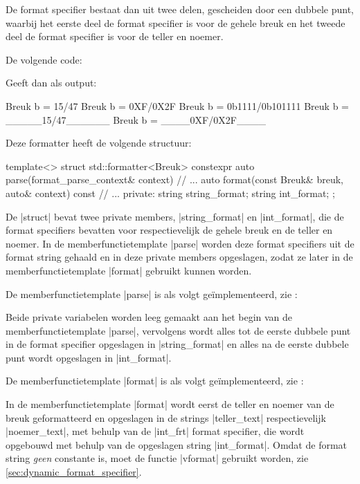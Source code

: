 \begin{cpplstShortInline}
De format specifier bestaat dan uit twee delen, gescheiden door een dubbele punt, waarbij het eerste deel de format specifier is voor de gehele breuk en het tweede deel de format specifier is voor de teller en noemer.

De volgende code:

Geeft dan als output:
\begin{coutput}
Breuk b = 15/47
Breuk b = 0XF/0X2F
Breuk b = 0b1111/0b101111
Breuk b = _____15/47______
Breuk b = ____0XF/0X2F____
\end{coutput}

Deze formatter heeft de volgende structuur:
\begin{cpplstfragment}
template<>
struct std::formatter<Breuk> {
    constexpr auto parse(format_parse_context& context) {
	// ...
	}
	auto format(const Breuk& breuk, auto& context) const {
	// ...
	}
private:
    string string_format;
    string int_format;
};
\end{cpplstfragment}

De |struct| bevat twee private members, |string_format| en |int_format|, die de format specifiers bevatten voor respectievelijk de gehele breuk en de teller en noemer.
In de memberfunctietemplate |parse| worden deze format specifiers uit de format string gehaald en in deze private members opgeslagen, zodat ze later in de memberfunctietemplate |format| gebruikt kunnen worden.

De memberfunctietemplate |parse| is als volgt geïmplementeerd, zie :

Beide private variabelen worden leeg gemaakt aan het begin van de memberfunctietemplate |parse|, vervolgens wordt alles tot de eerste dubbele punt in de format specifier opgeslagen in |string_format| en alles na de eerste dubbele punt wordt opgeslagen in |int_format|.

De memberfunctietemplate |format| is als volgt geïmplementeerd, zie :

In de memberfunctietemplate |format| wordt eerst de teller en noemer van de breuk geformatteerd en opgeslagen in de strings |teller_text| respectievelijk |noemer_text|, met behulp van de |int_frt| format specifier, die wordt opgebouwd met behulp van de opgeslagen string |int_format|.
Omdat de format string \emph{geen}  constante is, moet de functie |vformat| gebruikt worden, zie \cref{sec:dynamic_format_specifier}.


\end{cpplstShortInline}
